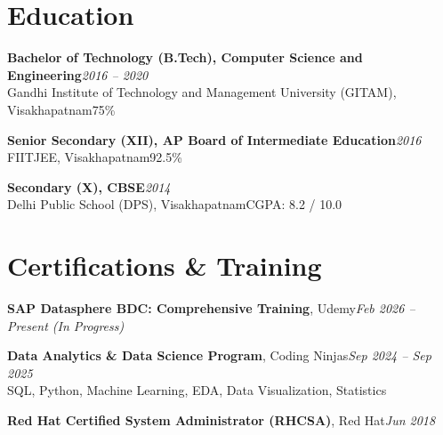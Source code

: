 \documentclass[10pt, letterpaper]{article}
\begin{document}
\section{Education}

{\bfseries Bachelor of Technology (B.Tech), Computer Science and Engineering}\hfill{\small\color{muted}\textit{2016 -- 2020}}\\
{\small\color{muted}Gandhi Institute of Technology and Management University (GITAM), Visakhapatnam\hfill 75\%}

\vspace{2pt}
{\bfseries Senior Secondary (XII), AP Board of Intermediate Education}\hfill{\small\color{muted}\textit{2016}}\\
{\small\color{muted}FIITJEE, Visakhapatnam\hfill 92.5\%}

\vspace{2pt}
{\bfseries Secondary (X), CBSE}\hfill{\small\color{muted}\textit{2014}}\\
{\small\color{muted}Delhi Public School (DPS), Visakhapatnam\hfill CGPA: 8.2 / 10.0}

\section{Certifications \& Training}

{\bfseries SAP Datasphere BDC: Comprehensive Training}, Udemy\hfill{\small\color{muted}\textit{Feb 2026 -- Present \emph{(In Progress)}}}

\vspace{1pt}
{\bfseries Data Analytics \& Data Science Program}, Coding Ninjas\hfill{\small\color{muted}\textit{Sep 2024 -- Sep 2025}}\\
{\small\color{muted}SQL, Python, Machine Learning, EDA, Data Visualization, Statistics}

\vspace{1pt}
{\bfseries Red Hat Certified System Administrator (RHCSA)}, Red Hat\hfill{\small\color{muted}\textit{Jun 2018}}

\end{document}

